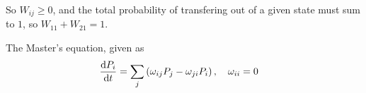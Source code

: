 \documentclass[a4paper, english, 12pt]{article}
\newcommand{\closed}[1]{\left( #1 \right)}
\begin{document}
\begin{multicols*}{2}
So $W_{ij}\geq0$, and the total probability of transfering out of a given state must sum to $1$, so $W_{11}+W_{21}=1$. 


The Master's equation, given as 
\begin{align*}
    \dv{P_i}{t} &= \sum_{j} \closed{\omega_{ij}P_j - \omega_{ji}P_i},\quad \omega_{ii}=0
\end{align*}

\end{multicols*}
\end{document}
